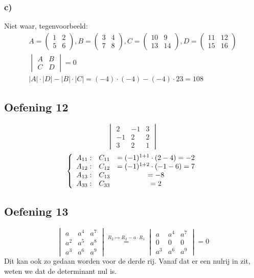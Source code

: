 \documentclass[lineaire_algebra_oplossingen.tex]{subfiles}
\begin{document}
\subsubsection*{c)}
Niet waar, tegenvoorbeeld:
\begin{gather*}
    A = 
    \begin{pmatrix}
        1 & 2\\
        5 & 6
    \end{pmatrix} 
    , B = 
    \begin{pmatrix}
        3 & 4\\
        7 & 8
    \end{pmatrix}
    , C = 
    \begin{pmatrix}
        10 & 9\\
        13 & 14
    \end{pmatrix}
    , D = 
    \begin{pmatrix}
        11 & 12\\
        15 & 16
    \end{pmatrix}\\
    \begin{vmatrix}
        A & B\\
        C & D
    \end{vmatrix}
    = 0\\
    |A| \cdot |D| - |B| \cdot |C| = (-4) \cdot (-4) - (-4) \cdot 23 = 108
\end{gather*}


\subsection{Oefening 12}
\[
\begin{vmatrix}
2 & -1 & 3\\
-1 & 2 & 2\\
3 & 2 & 1
\end{vmatrix}
\]
\[
\left\lbrace
\begin{array}{c c c}
A_{11}: &C_{11} &= (-1)^{1+1} \cdot (2 - 4) = -2\\
A_{12}: &C_{12} &= (-1)^{1+2} \cdot (-1 -6) = 7\\
A_{13}: &C_{13} &= -8\\
A_{33}: &C_{33} &= 2\\
\end{array}
\right.
\]
\subsection{Oefening 13}
$$
\begin{vmatrix}
a & a^4 & a^7\\
a^2 & a^5 & a^8\\
a^3 & a^6 & a^9
\end{vmatrix}
\overset{R_2 \longmapsto R_2 - a \cdot R_1}{=}
\begin{vmatrix}
a & a^4 & a^7\\
0 & 0 & 0\\
a^3 & a^6 & a^9
\end{vmatrix}
= 0
$$
Dit kan ook zo gedaan worden voor de derde rij. Vanaf dat er een nulrij in zit, weten we dat de determinant nul is.
\end{document}
